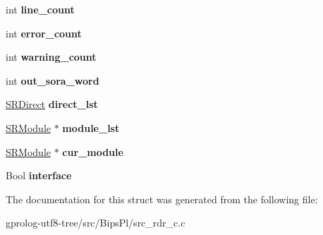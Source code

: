 \begin{DoxyCompactItemize}
\item 
int {\bfseries line\+\_\+count}\hypertarget{structSRInf_aa63231d051d7fba34831d0be05e1f8cd}{}\label{structSRInf_aa63231d051d7fba34831d0be05e1f8cd}

\item 
int {\bfseries error\+\_\+count}\hypertarget{structSRInf_af2257adc69f0b5ee25c89a2b33b6c074}{}\label{structSRInf_af2257adc69f0b5ee25c89a2b33b6c074}

\item 
int {\bfseries warning\+\_\+count}\hypertarget{structSRInf_a432e213e2296877a22dd6e174cb65586}{}\label{structSRInf_a432e213e2296877a22dd6e174cb65586}

\item 
int {\bfseries out\+\_\+sora\+\_\+word}\hypertarget{structSRInf_af83f16042ade6e52ac4859f203ef0db4}{}\label{structSRInf_af83f16042ade6e52ac4859f203ef0db4}

\item 
\hyperlink{structSRDirect}{S\+R\+Direct} {\bfseries direct\+\_\+lst}\hypertarget{structSRInf_a54874ef3dc4c403e8913a9fa4e85158e}{}\label{structSRInf_a54874ef3dc4c403e8913a9fa4e85158e}

\item 
\hyperlink{structsr__module}{S\+R\+Module} $\ast$ {\bfseries module\+\_\+lst}\hypertarget{structSRInf_a3562e122c09ab0c9eabb4b1d21a86408}{}\label{structSRInf_a3562e122c09ab0c9eabb4b1d21a86408}

\item 
\hyperlink{structsr__module}{S\+R\+Module} $\ast$ {\bfseries cur\+\_\+module}\hypertarget{structSRInf_a791b120048e8a53ac8e6b172c3b33ea2}{}\label{structSRInf_a791b120048e8a53ac8e6b172c3b33ea2}

\item 
Bool {\bfseries interface}\hypertarget{structSRInf_af83fb089c4c9359b0d80cbe96bd01adc}{}\label{structSRInf_af83fb089c4c9359b0d80cbe96bd01adc}

\end{DoxyCompactItemize}


The documentation for this struct was generated from the following file\+:\begin{DoxyCompactItemize}
\item 
gprolog-\/utf8-\/tree/src/\+Bips\+Pl/src\+\_\+rdr\+\_\+c.\+c\end{DoxyCompactItemize}
